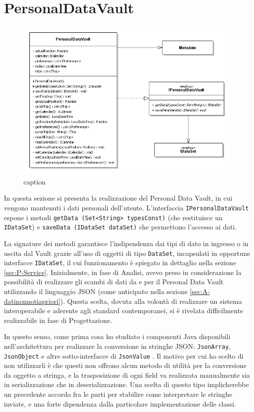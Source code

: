 \section{PersonalDataVault}
\begin{figure} [h]
	\centering
	\includegraphics[width=0.8\linewidth]{pictures/PersonalDataVault.png}
	\caption{caption}
	\label{fig:PersonalDataVault}
\end{figure}
In questa sezione si presenta la realizzazione del Personal Data Vault, in cui vengono mantenuti i dati personali dell’utente. L’interfaccia \texttt{IPersonalDataVault} espone i metodi \texttt{getData (Set<String> typesConst)} (che restituisce un \texttt{IDataSet}) e \texttt{saveData (IDataSet dataSet)} che permettono l’accesso ai dati.

La signature dei metodi garantisce l’indipendenza dai tipi di dato in ingresso o in uscita dal Vault grazie all’uso di oggetti di tipo \texttt{DataSet}, incapsulati in opportune interfacce \texttt{IDataSet}, il cui funzionamento \`e spiegato in dettaglio nella sezione \ref{sec:P-Service}. Inizialmente, in fase di Analisi, avevo preso in considerazione la possibilit\`a di realizzare gli scambi di dati da e per il Personal Data Vault utilizzando il linguaggio JSON (come anticipato nella sezione \ref{sec:A-datinonnotiapriori}). Questa scelta, dovuta alla volont\`a di realizzare un sistema interoperabile e aderente agli standard contemporanei, si \`e rivelata difficilmente realizzabile in fase di Progettazione.

In questo senso, come prima cosa ho studiato i componenti Java disponibili nell’architettura per realizzare la conversione in stringhe JSON: \texttt{JsonArray}, \texttt{JsonObject} e altre sotto-interfacce di \texttt{JsonValue} \cite{javajsonobject}. Il motivo per cui ho scelto di non utilizzarli \`e che questi non offrono alcun metodo di utilit\`a per la conversione da oggetto a stringa, e la trasposizione di ogni field va realizzata manualmente sia in serializzazione che in deserializzazione. Una scelta di questo tipo implicherebbe un precedente accordo fra le parti per stabilire come interpretare le stringhe inviate, e una forte dipendenza dalla particolare implementazione delle classi.
 
